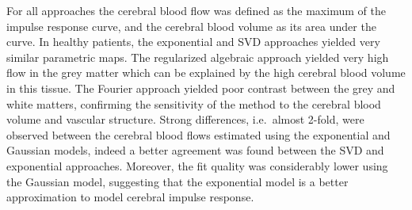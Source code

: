 For all approaches the cerebral blood flow was defined as the maximum of the impulse response curve, and the cerebral blood volume as its area under the curve.
In healthy patients, the exponential and SVD approaches yielded very similar parametric maps.
The regularized algebraic approach yielded very high flow in the grey matter which can be explained by the high cerebral blood volume in this tissue.
The Fourier approach yielded poor contrast between the grey and white matters, confirming the sensitivity of the method to the cerebral blood volume and vascular structure.
Strong differences, i.e.~almost 2-fold, were observed between the cerebral blood flows estimated using the exponential and Gaussian models, indeed a better agreement was found between the SVD and exponential approaches.
Moreover, the fit quality was considerably lower using the Gaussian model, suggesting that the exponential model is a better approximation to model cerebral impulse response.

